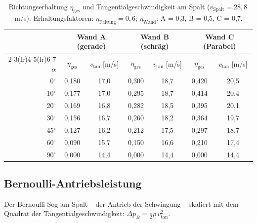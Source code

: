 \documentclass[11pt,a4paper]{article}
\begin{document}
\begin{table}[H]
\centering\small
\begin{tabular}{r c c c c c c}
\toprule
& \multicolumn{2}{c}{\textbf{Wand A (gerade)}} & \multicolumn{2}{c}{\textbf{Wand B (schräg)}} & \multicolumn{2}{c}{\textbf{Wand C (Parabel)}} \\
\cmidrule(lr){2-3}\cmidrule(lr){4-5}\cmidrule(lr){6-7}
$\alpha$ & $\eta_\text{ges}$ & $v_\text{tan}$ [m/s] & $\eta_\text{ges}$ & $v_\text{tan}$ [m/s] & $\eta_\text{ges}$ & $v_\text{tan}$ [m/s] \\
\midrule
0${}^\circ$  & 0{,}180 & 17{,}0 & 0{,}300 & 18{,}7 & 0{,}420 & 20{,}5 \\
10${}^\circ$ & 0{,}177 & 17{,}0 & 0{,}295 & 18{,}7 & 0{,}414 & 20{,}4 \\
20${}^\circ$ & 0{,}169 & 16{,}8 & 0{,}282 & 18{,}5 & 0{,}395 & 20{,}1 \\
30${}^\circ$ & 0{,}156 & 16{,}7 & 0{,}260 & 18{,}2 & 0{,}364 & 19{,}7 \\
45${}^\circ$ & 0{,}127 & 16{,}2 & 0{,}212 & 17{,}5 & 0{,}297 & 18{,}7 \\
60${}^\circ$ & 0{,}090 & 15{,}7 & 0{,}150 & 16{,}6 & 0{,}210 & 17{,}4 \\
90${}^\circ$ & 0{,}000 & 14{,}4 & 0{,}000 & 14{,}4 & 0{,}000 & 14{,}4 \\
\bottomrule
\end{tabular}
\caption{Richtungserhaltung $\eta_\text{ges}$ und Tangentialgeschwindigkeit am Spalt ($v_\text{Spalt} = 28{,}8$\,m/s). Erhaltungsfaktoren: $\eta_\text{Faltung} = 0{,}6$; $\eta_\text{Wand}$: A = 0{,}3, B = 0{,}5, C = 0{,}7.}
\end{table}

\subsection{Bernoulli-Antriebsleistung}

Der Bernoulli-Sog am Spalt -- der Antrieb der Schwingung -- skaliert mit dem Quadrat der Tangentialgeschwindigkeit: $\Delta p_B = \tfrac{1}{2}\rho\, v_\text{tan}^2$.
\end{document}
